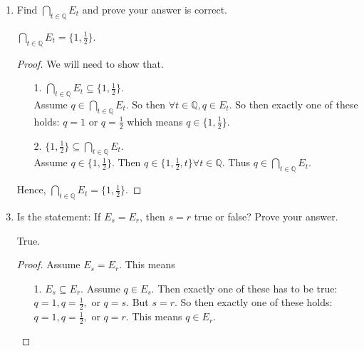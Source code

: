 \documentclass{article}
\theoremstyle{claim}
\theoremstyle{definition}
\begin{document}
\begin{enumerate}
\begin{enumerate}
\begin{proof}
\begin{enumerate}
                    \item[2.] We also want to show $\mathbb{Q} \subseteq \bigcup\limits_{t \in \mathbb{Q}} E_t$.\\
                        Assume $q \in \mathbb{Q}$. Then $q \in E_q$. Then $q \in \bigcup\limits_{t \in \mathbb{Q}} E_t$.
                \end{enumerate}
                Thus $\bigcup\limits_{t \in \mathbb{Q}} E_t = \mathbb{Q}$.
            \end{proof}
        \item Find $\bigcap\limits_{t \in \mathbb{Q}} E_t$ and prove your answer is correct.
        \item[] $\bigcap\limits_{t \in \mathbb{Q}} E_t = \{ 1, \frac{1}{2} \}$.
            \begin{proof}
                We will need to show that.
                \begin{enumerate}
                    \item[1.] $\bigcap\limits_{t \in \mathbb{Q}} E_t \subseteq \{ 1, \frac{1}{2} \}$.\\
                        Assume $q \in \bigcap\limits_{t \in \mathbb{Q}} E_t$. So then $\forall t \in \mathbb{Q}, q \in E_t$. So then exactly one of these holds: $q = 1$ or $q = \frac{1}{2}$ which means $q \in \{ 1, \frac{1}{2} \}$.
                    \item[2.] $\{ 1, \frac{1}{2} \} \subseteq \bigcap\limits_{t \in \mathbb{Q}} E_t$.\\
                        Assume $q \in \{ 1, \frac{1}{2} \}$. Then $q \in \{ 1, \frac{1}{2}, t\} \forall t \in \mathbb{Q}$. Thus $q  \in \bigcap\limits_{t \in \mathbb{Q}} E_t$.
                \end{enumerate}
                Hence, $\bigcap\limits_{t \in \mathbb{Q}} E_t = \{ 1, \frac{1}{2} \}$.
            \end{proof}
        \item Is the statement: If $E_s = E_r$, then $s = r$ true or false? Prove your answer.
        \item[] True.
            \begin{proof}
                Assume $E_s = E_r$. This means
                \begin{enumerate}
                    \item[1.] $E_s \subseteq E_r$.
                        Assume $q \in E_s$. Then exactly one of these has to be true: $q = 1, q = \frac{1}{2}, \text{ or } q = s$. But $s = r$. So then exactly one of these holds: $q = 1, q = \frac{1}{2}, \text{ or } q = r$. This means $q \in E_r$.

\end{enumerate}
\end{proof}
\end{enumerate}
\end{enumerate}
\end{document}
